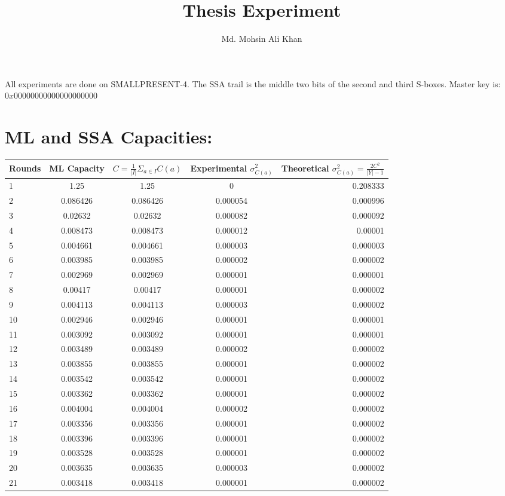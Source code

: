 \documentclass[9pt]{article}
\title{Thesis Experiment}
\author{Md. Mohsin Ali Khan}
\begin{document}
\maketitle
All experiments are done on SMALLPRESENT-4. The SSA trail is the middle two bits of the second and third S-boxes. Master key is: $0x00000000000000000000$
\section{ML and SSA Capacities:}
\begin{tabular}{l*{3}{c}r}
Rounds & ML Capacity & $C = \frac{1}{|I|}\Sigma_{a \in I}C(a)$ & Experimental $\sigma^2_{C(a)}$ & Theoretical $\sigma^2_{C(a)} = \frac{2C^2}{|Y|-1}$  \\
\hline
1 & 1.25 & 1.25 & 0 & 0.208333 \\
2 & 0.086426 & 0.086426 & 0.000054 & 0.000996 \\
3 & 0.02632 & 0.02632 & 0.000082 & 0.000092 \\
4 & 0.008473 & 0.008473 & 0.000012 & 0.00001 \\
5 & 0.004661 & 0.004661 & 0.000003 & 0.000003 \\
6 & 0.003985 & 0.003985 & 0.000002 & 0.000002 \\
7 & 0.002969 & 0.002969 & 0.000001 & 0.000001 \\
8 & 0.00417 & 0.00417 & 0.000001 & 0.000002 \\
9 & 0.004113 & 0.004113 & 0.000003 & 0.000002 \\
10 & 0.002946 & 0.002946 & 0.000001 & 0.000001 \\
11 & 0.003092 & 0.003092 & 0.000001 & 0.000001 \\
12 & 0.003489 & 0.003489 & 0.000002 & 0.000002 \\
13 & 0.003855 & 0.003855 & 0.000001 & 0.000002 \\
14 & 0.003542 & 0.003542 & 0.000001 & 0.000002 \\
15 & 0.003362 & 0.003362 & 0.000001 & 0.000002 \\
16 & 0.004004 & 0.004004 & 0.000002 & 0.000002 \\
17 & 0.003356 & 0.003356 & 0.000001 & 0.000002 \\
18 & 0.003396 & 0.003396 & 0.000001 & 0.000002 \\
19 & 0.003528 & 0.003528 & 0.000001 & 0.000002 \\
20 & 0.003635 & 0.003635 & 0.000003 & 0.000002 \\
21 & 0.003418 & 0.003418 & 0.000001 & 0.000002 \\

\end{tabular}
\end{document}
